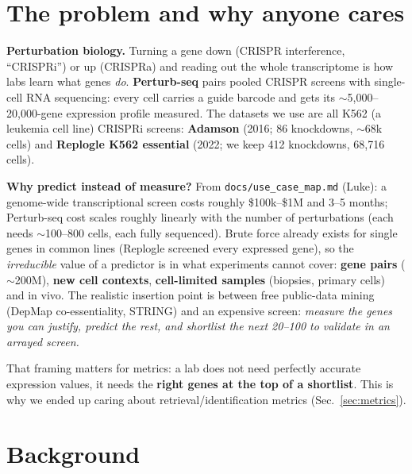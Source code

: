 \documentclass[11pt]{article}
\newcommand{\code}[1]{\texttt{\small #1}}
\begin{document}
\tableofcontents
\vspace{0.5em}

\section{The problem and why anyone cares}

\textbf{Perturbation biology.} Turning a gene down (CRISPR interference, ``CRISPRi'') or up (CRISPRa) and reading out the whole transcriptome is how labs learn what genes \emph{do}. \textbf{Perturb-seq} pairs pooled CRISPR screens with single-cell RNA sequencing: every cell carries a guide barcode and gets its $\sim$5,000--20,000-gene expression profile measured. The datasets we use are all K562 (a leukemia cell line) CRISPRi screens: \textbf{Adamson} (2016; 86 knockdowns, $\sim$68k cells) and \textbf{Replogle K562 essential} (2022; we keep 412 knockdowns, 68,716 cells).

\textbf{Why predict instead of measure?} From \code{docs/use\_case\_map.md} (Luke): a genome-wide transcriptional screen costs roughly \$100k--\$1M and 3--5 months; Perturb-seq cost scales roughly linearly with the number of perturbations (each needs $\sim$100--800 cells, each fully sequenced). Brute force already exists for single genes in common lines (Replogle screened every expressed gene), so the \emph{irreducible} value of a predictor is in what experiments cannot cover: \textbf{gene pairs} ($\sim$200M), \textbf{new cell contexts}, \textbf{cell-limited samples} (biopsies, primary cells) and in vivo. The realistic insertion point is between free public-data mining (DepMap co-essentiality, STRING) and an expensive screen: \emph{measure the genes you can justify, predict the rest, and shortlist the next 20--100 to validate in an arrayed screen.}

That framing matters for metrics: a lab does not need perfectly accurate expression values, it needs the \textbf{right genes at the top of a shortlist}. This is why we ended up caring about retrieval/identification metrics (Sec.~\ref{sec:metrics}).

\section{Background}
\end{document}
